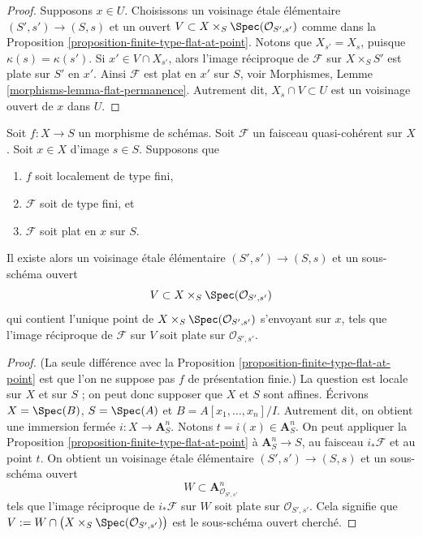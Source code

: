\begin{proof}
Supposons $x \in U$. Choisissons un voisinage \'etale élémentaire
$(S', s') \to (S, s)$ et un ouvert
$V \subset X \times_S \Spec(\mathcal{O}_{S', s'})$ comme dans la
Proposition \ref{proposition-finite-type-flat-at-point}.
Notons que $X_{s'} = X_s$, puisque $\kappa(s) = \kappa(s')$.
Si $x' \in V \cap X_{s'}$, alors l'image réciproque de $\mathcal{F}$ sur
$X \times_S S'$ est plate sur $S'$ en $x'$. Ainsi $\mathcal{F}$ est
plat en $x'$ sur $S$, voir
Morphismes, Lemme \ref{morphisms-lemma-flat-permanence}.
Autrement dit, $X_s \cap V \subset U$ est un voisinage ouvert
de $x$ dans $U$.
\end{proof}

\begin{lemma}
\label{lemma-finite-type-flat-at-point}
Soit $f : X \to S$ un morphisme de schémas.
Soit $\mathcal{F}$ un faisceau quasi-cohérent sur $X$.
Soit $x \in X$ d'image $s \in S$.
Supposons que
\begin{enumerate}
\item $f$ soit localement de type fini,
\item $\mathcal{F}$ soit de type fini, et
\item $\mathcal{F}$ soit plat en $x$ sur $S$.
\end{enumerate}
Il existe alors un voisinage \'etale élémentaire $(S', s') \to (S, s)$
et un sous-schéma ouvert
$$
V \subset X \times_S \Spec(\mathcal{O}_{S', s'})
$$
qui contient l'unique point de
$X \times_S \Spec(\mathcal{O}_{S', s'})$ s'envoyant sur $x$,
tels que l'image réciproque de $\mathcal{F}$ sur $V$ soit plate sur
$\mathcal{O}_{S', s'}$.
\end{lemma}

\begin{proof}
(La seule différence avec la
Proposition \ref{proposition-finite-type-flat-at-point}
est que l'on ne suppose pas $f$ de présentation finie.)
La question est locale sur $X$ et sur $S$ ; on peut donc supposer que $X$ et $S$
sont affines. Écrivons $X = \Spec(B)$, $S = \Spec(A)$ et
$B = A[x_1, \ldots, x_n]/I$. Autrement dit, on obtient une immersion fermée
$i : X \to \mathbf{A}^n_S$. Notons $t = i(x) \in \mathbf{A}^n_S$.
On peut appliquer la
Proposition \ref{proposition-finite-type-flat-at-point}
à $\mathbf{A}^n_S \to S$, au faisceau $i_*\mathcal{F}$
et au point $t$. On obtient un voisinage
\'etale élémentaire $(S', s') \to (S, s)$ et un sous-schéma ouvert
$$
W \subset \mathbf{A}^n_{\mathcal{O}_{S', s'}}
$$
tels que l'image réciproque de $i_*\mathcal{F}$ sur $W$ soit plate sur
$\mathcal{O}_{S', s'}$. Cela signifie que
$V := W \cap \big(X \times_S \Spec(\mathcal{O}_{S', s'})\big)$
est le sous-schéma ouvert cherché.
\end{proof}

